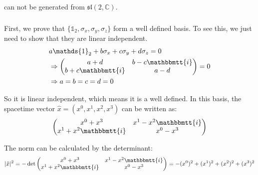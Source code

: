 \documentclass[]{ctexart}
\newcommand{\mi}{\mathbbmtt{i}}
\begin{document}
			can not be generated from $\mathfrak{sl}(2,\mathbb{C})$. 
		
		\subsubsection{}
			First, we prove that $\{\mathds{1}_2,\sigma_x,\sigma_y,\sigma_z\}$ form a well defined basis. To see this, we just need to show that they are linear independent. 
				\begin{equation*}
				\begin{aligned}
					&a\mathds{1}_2+b\sigma_x+c\sigma_y+d\sigma_z=0\\
					&\Rightarrow 
					\begin{pmatrix}
					a+d & b-c\mi\\
					b+c\mi & a-d
					\end{pmatrix}=0\\
					&\Rightarrow a=b=c=d=0
				\end{aligned}
				\end{equation*}
			
			So it is linear independent, which means it is a well defined. In this basis, the spacetime vector $\hat{x}=(x^0,x^1,x^2,x^3)$ can be written as:
				\begin{equation*}
				\begin{aligned}
					\begin{pmatrix}
						x^0+x^3 & x^1-x^2\mi\\
						x^1+x^2\mi & x^0-x^3
					\end{pmatrix}
				\end{aligned}
				\end{equation*}
			
			The norm can be calculated by the determinant:
				\begin{equation*}
				\begin{aligned}
					|\hat{x}|^2=-\det
					\begin{pmatrix}
					x^0+x^3 & x^1-x^2\mi\\
					x^1+x^2\mi & x^0-x^3
					\end{pmatrix}=-(x^0)^2+(x^1)^2+(x^2)^2+(x^3)^2
				\end{aligned}
				\end{equation*}
			
\end{document}
